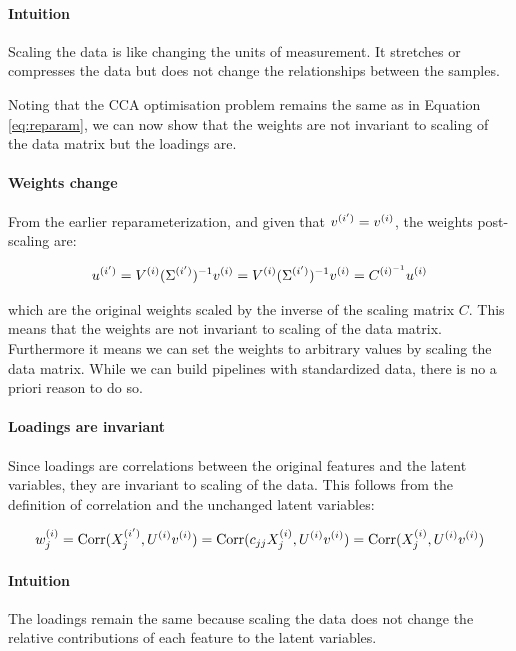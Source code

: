 \paragraph{Intuition}
Scaling the data is like changing the units of measurement.
It stretches or compresses the data but does not change the relationships between the samples.

Noting that the CCA optimisation problem remains the same as in Equation \ref{eq:reparam},
we can now show that the weights are not invariant to scaling of the data matrix but the \gls{loadings} are.

\paragraph{Weights change}

From the earlier reparameterization, and given that $v^{(i')}=v^{(i)}$, the weights post-scaling are:

\begin{align}
    u^{(i')} = V^{(i)}(\Sigma^{(i')})^{-1}v^{(i)} = V^{(i)}(\Sigma^{(i')})^{-1}v^{(i)} = C^{{(i)}^{-1}}u^{(i)} \label{eq:weights_change2}
\end{align}

which are the original weights scaled by the inverse of the scaling matrix \( C \). This means that the weights are not invariant to scaling of the data matrix. Furthermore it means we can set the weights to arbitrary values by scaling the data matrix.
While we can build pipelines with standardized data, there is no a priori reason to do so.

\paragraph{Loadings are invariant}

Since \gls{loadings} are correlations between the original features and the latent variables, they are invariant to scaling of the data.
This follows from the definition of correlation and the unchanged latent variables:

\begin{align}
    w^{(i)}_j = \operatorname{Corr}(X^{(i')}_j, U^{(i)}v^{(i)}) = \operatorname{Corr}(c_{jj}X^{(i)}_j, U^{(i)}v^{(i)}) = \operatorname{Corr}(X^{(i)}_j, U^{(i)}v^{(i)}) \label{eq:loading_invariant}
\end{align}

\paragraph{Intuition}
The \gls{loadings} remain the same because scaling the data does not change the relative contributions of each feature to the latent variables.

